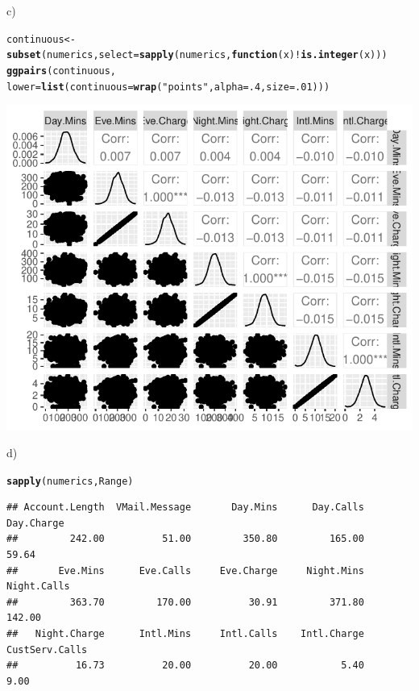 \documentclass{article}\usepackage[]{graphicx}\usepackage[]{color}
\makeatletter
\def\maxwidth{ %
  \ifdim\Gin@nat@width>\linewidth
    \linewidth
  \else
    \Gin@nat@width
  \fi
}
\newcommand{\hlnum}[1]{\textcolor[rgb]{0.686,0.059,0.569}{#1}}%
\newcommand{\hlstr}[1]{\textcolor[rgb]{0.192,0.494,0.8}{#1}}%
\newcommand{\hlopt}[1]{\textcolor[rgb]{0,0,0}{#1}}%
\newcommand{\hlstd}[1]{\textcolor[rgb]{0.345,0.345,0.345}{#1}}%
\newcommand{\hlkwa}[1]{\textcolor[rgb]{0.161,0.373,0.58}{\textbf{#1}}}%
\newcommand{\hlkwb}[1]{\textcolor[rgb]{0.69,0.353,0.396}{#1}}%
\newcommand{\hlkwc}[1]{\textcolor[rgb]{0.333,0.667,0.333}{#1}}%
\newcommand{\hlkwd}[1]{\textcolor[rgb]{0.737,0.353,0.396}{\textbf{#1}}}%
\newenvironment{kframe}{%
 \def\at@end@of@kframe{}%
 \ifinner\ifhmode%
  \def\at@end@of@kframe{\end{minipage}}%
  \begin{minipage}{\columnwidth}%
 \fi\fi%
 \def\FrameCommand##1{\hskip\@totalleftmargin \hskip-\fboxsep
 \colorbox{shadecolor}{##1}\hskip-\fboxsep
     \hskip-\linewidth \hskip-\@totalleftmargin \hskip\columnwidth}%
 \MakeFramed {\advance\hsize-\width
   \@totalleftmargin\z@ \linewidth\hsize
   \@setminipage}}%
 {\par\unskip\endMakeFramed%
 \at@end@of@kframe}
\newenvironment{knitrout}{}{} %
\makeatother
\begin{document}
\begin{description}
\begin{knitrout}
\end{knitrout}

\item{c)}

\begin{knitrout}
\color{fgcolor}\begin{kframe}
\begin{alltt}
\hlstd{continuous} \hlkwb{<-} \hlkwd{subset}\hlstd{(numerics,} \hlkwc{select}\hlstd{=}\hlkwd{sapply}\hlstd{(numerics,} \hlkwa{function}\hlstd{(}\hlkwc{x}\hlstd{)} \hlopt{!}\hlkwd{is.integer}\hlstd{(x)))}
\hlkwd{ggpairs}\hlstd{(continuous,}
        \hlkwc{lower}\hlstd{=}\hlkwd{list}\hlstd{(}\hlkwc{continuous}\hlstd{=}\hlkwd{wrap}\hlstd{(}\hlstr{"points"}\hlstd{,} \hlkwc{alpha}\hlstd{=}\hlnum{.4}\hlstd{,} \hlkwc{size}\hlstd{=}\hlnum{.01}\hlstd{)))}
\end{alltt}
\end{kframe}
\includegraphics[width=\maxwidth]{figure/Pair_plot_for_continuous_variables-1} 

\end{knitrout}

\item{d)}

\begin{knitrout}
\color{fgcolor}\begin{kframe}
\begin{alltt}
\hlkwd{sapply}\hlstd{(numerics, Range)}
\end{alltt}
\begin{verbatim}
## Account.Length  VMail.Message       Day.Mins      Day.Calls     Day.Charge 
##         242.00          51.00         350.80         165.00          59.64 
##       Eve.Mins      Eve.Calls     Eve.Charge     Night.Mins    Night.Calls 
##         363.70         170.00          30.91         371.80         142.00 
##   Night.Charge      Intl.Mins     Intl.Calls    Intl.Charge CustServ.Calls 
##          16.73          20.00          20.00           5.40           9.00
\end{verbatim}
\end{kframe}
\end{knitrout}


\end{description}
\end{document}
